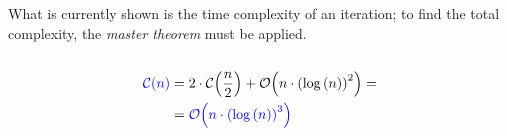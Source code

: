 \begin{frame}{\cwwsortrecursivecostframe}
\begin{columns}[c]
                    \begin{column}{0.25\textwidth}
                        What is currently shown is the time complexity of an iteration; to find the total complexity, the \textit{master theorem} must be applied.
                    \end{column}
                \end{columns}
            \end{frame}

            \begin{frame}{\cwwsortrecursivecostframe}
                \begin{align*}
                    \textcolor{blue}{\mathcal{C}{\left(n\right)}} = & \; 2 \cdot \mathcal{C}{\left(\frac{n}{2}\right)} + \mathcal{O}{\left(n \cdot \left(\log{\left(n\right)}\right)^2\right)} = \\
                    = & \; \textcolor{blue}{\mathcal{O}{\left(n \cdot \left(\log{\left(n\right)}\right)^3\right)}}
                \end{align*}
            \end{frame}

